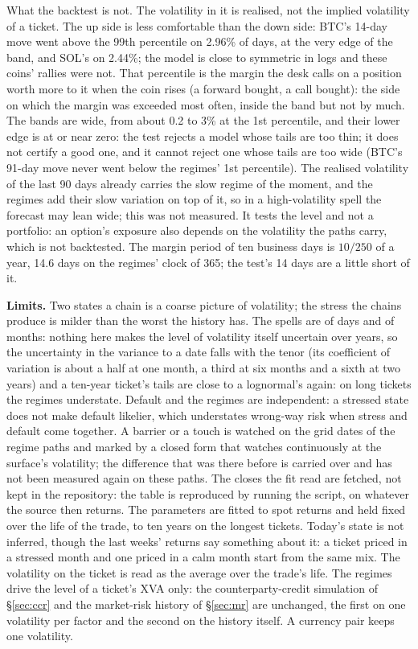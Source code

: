 \documentclass[11pt,a4paper]{article}
\begin{document}
What the backtest is not. The volatility in it is realised, not the implied volatility of a ticket. The up side is less comfortable than the down side: BTC's 14-day move went above the 99th percentile on 2.96\% of days, at the very edge of the band, and SOL's on 2.44\%; the model is close to symmetric in logs and these coins' rallies were not. That percentile is the margin the desk calls on a position worth more to it when the coin rises (a forward bought, a call bought): the side on which the margin was exceeded most often, inside the band but not by much. The bands are wide, from about 0.2 to 3\% at the 1st percentile, and their lower edge is at or near zero: the test rejects a model whose tails are too thin; it does not certify a good one, and it cannot reject one whose tails are too wide (BTC's 91-day move never went below the regimes' 1st percentile). The realised volatility of the last 90 days already carries the slow regime of the moment, and the regimes add their slow variation on top of it, so in a high-volatility spell the forecast may lean wide; this was not measured. It tests the level and not a portfolio: an option's exposure also depends on the volatility the paths carry, which is not backtested. The margin period of ten business days is $10/250$ of a year, 14.6 days on the regimes' clock of 365; the test's 14 days are a little short of it.

\textbf{Limits.} Two states a chain is a coarse picture of volatility; the stress the chains produce is milder than the worst the history has. The spells are of days and of months: nothing here makes the level of volatility itself uncertain over years, so the uncertainty in the variance to a date falls with the tenor (its coefficient of variation is about a half at one month, a third at six months and a sixth at two years) and a ten-year ticket's tails are close to a lognormal's again: on long tickets the regimes understate. Default and the regimes are independent: a stressed state does not make default likelier, which understates wrong-way risk when stress and default come together. A barrier or a touch is watched on the grid dates of the regime paths and marked by a closed form that watches continuously at the surface's volatility; the difference that was there before is carried over and has not been measured again on these paths. The closes the fit read are fetched, not kept in the repository: the table is reproduced by running the script, on whatever the source then returns. The parameters are fitted to spot returns and held fixed over the life of the trade, to ten years on the longest tickets. Today's state is not inferred, though the last weeks' returns say something about it: a ticket priced in a stressed month and one priced in a calm month start from the same mix. The volatility on the ticket is read as the average over the trade's life. The regimes drive the level of a ticket's XVA only: the counterparty-credit simulation of \S\ref{sec:ccr} and the market-risk history of \S\ref{sec:mr} are unchanged, the first on one volatility per factor and the second on the history itself. A currency pair keeps one volatility.
\end{document}
